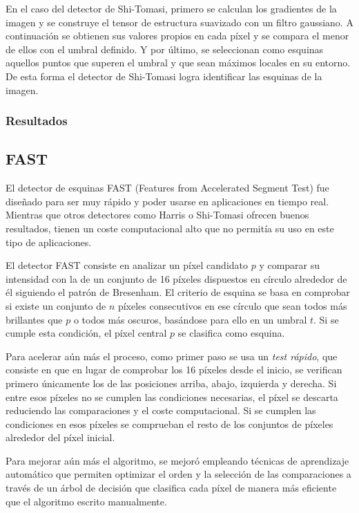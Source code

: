 En el caso del detector de Shi-Tomasi, primero se calculan los gradientes de la imagen y se construye el tensor de estructura suavizado con un filtro gaussiano. A continuación se obtienen sus valores propios en cada píxel y se compara el menor de ellos con el umbral definido. Y por último, se seleccionan como esquinas aquellos puntos que superen el umbral y que sean máximos locales en su entorno. De esta forma el detector de Shi-Tomasi logra identificar las esquinas de la imagen.


\subsubsection{Resultados}


\subsection{FAST}

El detector de esquinas FAST (Features from Accelerated Segment Test) \cite{rosten2006fast} fue diseñado para ser muy rápido y poder usarse en aplicaciones en tiempo real. Mientras que otros detectores como Harris o Shi-Tomasi ofrecen buenos resultados, tienen un coste computacional alto que no permitía su uso en este tipo de aplicaciones.

El detector FAST consiste en analizar un píxel candidato \(p\) y comparar su intensidad con la de un conjunto de 16 píxeles dispuestos en círculo alrededor de él siguiendo el patrón de Bresenham. El criterio de esquina se basa en comprobar si existe un conjunto de \(n\) píxeles consecutivos en ese círculo que sean todos más brillantes que \(p\) o todos más oscuros, basándose para ello en un umbral \(t\). Si se cumple esta condición, el píxel central \(p\) se clasifica como esquina.

Para acelerar aún más el proceso, como primer paso se usa un \emph{test rápido}, que consiste en que en lugar de comprobar los 16 píxeles desde el inicio, se verifican primero únicamente los de las posiciones arriba, abajo, izquierda y derecha. Si entre esos píxeles no se cumplen las condiciones necesarias, el píxel se descarta reduciendo las comparaciones y el coste computacional. Si se cumplen las condiciones en esos píxeles se comprueban el resto de los conjuntos de píxeles alrededor del píxel inicial.

Para mejorar aún más el algoritmo, se mejoró empleando técnicas de aprendizaje automático que permiten optimizar el orden y la selección de las comparaciones a través de un árbol de decisión que clasifica cada píxel de manera más eficiente que el algoritmo escrito manualmente.

